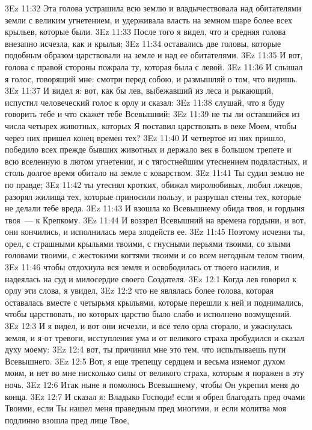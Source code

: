 \vs 3Ez 11:32 Эта голова устрашила всю землю и владычествовала над обитателями земли с великим угнетением, и удерживала власть на земном шаре более всех крыльев, которые были.
\vs 3Ez 11:33 После того я видел, что и средняя голова внезапно исчезла, как и крылья;
\vs 3Ez 11:34 оставались две головы, которые подобным образом царствовали на земле и над ее обитателями.
\vs 3Ez 11:35 И вот, голова с правой стороны пожрала ту, которая была с левой.
\vs 3Ez 11:36 И слышал я голос, говорящий мне: смотри перед собою, и размышляй о том, что видишь.
\vs 3Ez 11:37 И видел я: вот, как бы лев, выбежавший из леса и рыкающий, испустил человеческий голос к орлу и сказал:
\vs 3Ez 11:38 слушай, что я буду говорить тебе и что скажет тебе Всевышний:
\vs 3Ez 11:39 не ты ли оставшийся из числа четырех животных, которых Я поставил царствовать в веке Моем, чтобы через них пришел конец времен тех?
\vs 3Ez 11:40 И четвертое из них пришло, победило всех прежде бывших животных и держало век в большом трепете и всю вселенную в лютом угнетении, и с тягостнейшим утеснением подвластных, и столь долгое время обитало на земле с коварством.
\vs 3Ez 11:41 Ты судил землю не по правде;
\vs 3Ez 11:42 ты утеснял кротких, обижал миролюбивых, любил лжецов, разорял жилища тех, которые приносили пользу, и разрушал стены тех, которые не делали тебе вреда.
\vs 3Ez 11:43 И взошла ко Всевышнему обида твоя, и гордыня твоя~--- к Крепкому.
\vs 3Ez 11:44 И воззрел Всевышний на времена гордыни, и вот, они кончились, и исполнилась мера злодейств ее.
\vs 3Ez 11:45 Поэтому исчезни ты, орел, с страшными крыльями твоими, с гнусными перьями твоими, со злыми головами твоими, с жестокими когтями твоими и со всем негодным телом твоим,
\vs 3Ez 11:46 чтобы отдохнула вся земля и освободилась от твоего насилия, и надеялась на суд и милосердие своего Создателя.
\vs 3Ez 12:1 Когда лев говорил к орлу эти слова, я увидел,
\vs 3Ez 12:2 что не являлась более голова, которая оставалась вместе с четырьмя крыльями, которые перешли к ней и поднимались, чтобы царствовать, но которых царство было слабо и исполнено возмущений.
\vs 3Ez 12:3 И я видел, и вот они исчезли, и все тело орла сгорало, и ужаснулась земля, и я от тревоги, исступления ума и от великого страха пробудился и сказал духу моему:
\vs 3Ez 12:4 вот, ты причинил мне это тем, что испытываешь пути Всевышнего.
\vs 3Ez 12:5 Вот, я еще трепещу сердцем и весьма изнемог духом моим, и нет во мне нисколько силы от великого страха, которым я поражен в эту ночь.
\vs 3Ez 12:6 Итак ныне я помолюсь Всевышнему, чтобы Он укрепил меня до конца.
\vs 3Ez 12:7 И сказал я: Владыко Господи! если я обрел благодать пред очами Твоими, если Ты нашел меня праведным пред многими, и если молитва моя подлинно взошла пред лице Твое,
